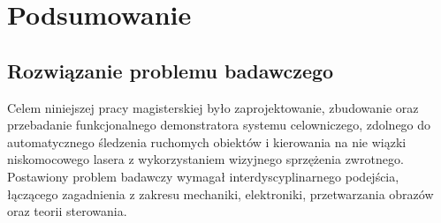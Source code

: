 \documentclass[a4paper,twoside,12pt]{book}
\begin{document}
%
%



\chapter{Podsumowanie}
\label{ch:podsumowanie}

\section{Rozwiązanie problemu badawczego}
Celem niniejszej pracy magisterskiej było zaprojektowanie, zbudowanie oraz przebadanie funkcjonalnego demonstratora systemu celowniczego, zdolnego do automatycznego śledzenia ruchomych obiektów i kierowania na nie wiązki niskomocowego lasera z wykorzystaniem wizyjnego sprzężenia zwrotnego. Postawiony problem badawczy wymagał interdyscyplinarnego podejścia, łączącego zagadnienia z zakresu mechaniki, elektroniki, przetwarzania obrazów oraz teorii sterowania.
\end{document}
